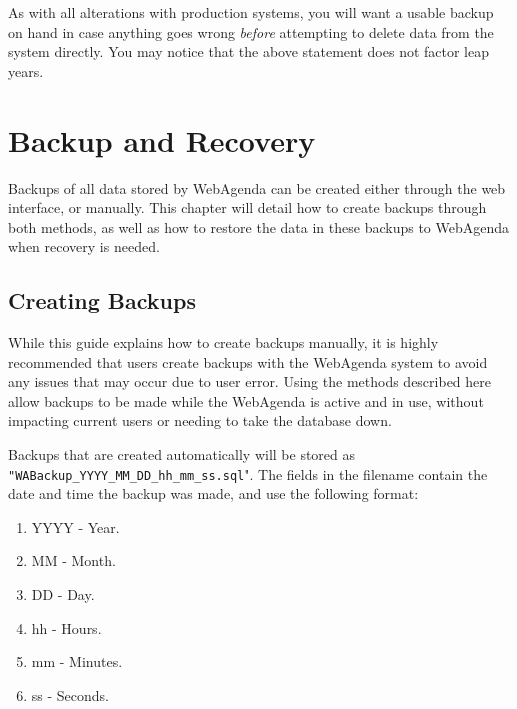 \documentclass[a4paper,10pt]{report}
\begin{document}
\par \noindent \hspace*{1cm} As with all alterations with production systems, you will want a usable backup on hand in case anything goes wrong \textit{before} attempting to delete data from the system directly. You may notice that the above statement does not factor leap years.



\chapter{Backup and Recovery}

\par \noindent \hspace*{1cm} Backups of all data stored by WebAgenda can be created either through the web interface, or manually.  This chapter will detail how to create backups through both methods, as well as how to restore the data in these backups to WebAgenda when recovery is needed.

\section{Creating Backups}

\par \noindent \hspace*{1cm} While this guide explains how to create backups manually, it is highly recommended that users create backups with the WebAgenda system to avoid any issues that may occur due to user error. Using the methods described here allow backups to be made while the WebAgenda is active and in use, without impacting current users or needing to take the database down.
\bigskip
\par \noindent \hspace*{1cm} Backups that are created automatically will be stored as \verb|"WABackup_YYYY_MM_DD_hh_mm_ss.sql|".  The fields in the filename contain the date and time the backup was made, and use the following format:
\begin{enumerate}
\item YYYY - Year.
\item MM - Month.
\item DD - Day.
\item hh - Hours.
\item mm - Minutes.
\item ss - Seconds.
\end{enumerate}
\end{document}
